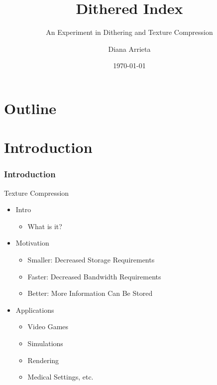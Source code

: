 \documentclass{beamer}
\title[Dithered Index]{Dithered Index}
\subtitle{An Experiment in Dithering and Texture Compression}
\author{Diana Arrieta}
\date{\today}
\begin{document}
\begin{frame}
\titlepage
\end{frame}

\section[]{Outline}
\begin{frame}
  \tableofcontents
\end{frame}

\section{Introduction}
\begin{frame}
   \frametitle{Introduction}
   Texture Compression
   \begin{itemize}
   \item{Intro}
      \begin{itemize}
      \item{What is it?}
      \end{itemize}
   \pause
   \item{Motivation}
   \pause
      \begin{itemize}
      \item{Smaller: Decreased Storage Requirements}
   \pause
      \item{Faster: Decreased Bandwidth Requirements}
   \pause
      \item{Better: More Information Can Be Stored}
   \pause
      \end{itemize}
   \item{Applications}
   \pause
      \begin{itemize}
      \item{Video Games}
      \item{Simulations}
      \item{Rendering}
      \item{Medical Settings, etc.}
      \end{itemize}
   \end{itemize}
\end{frame}
\end{document}
